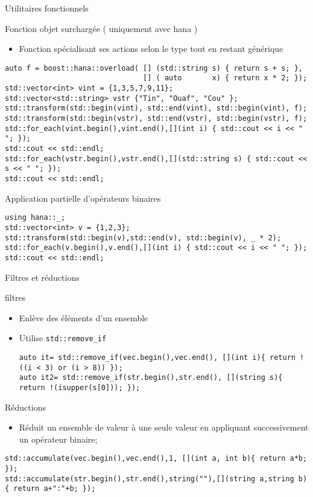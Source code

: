 \documentclass[handout,10pt]{beamer}
\begin{document}
\begin{frame}[fragile]{Utilitaires fonctionnels}
  \tiny
\begin{block}{Fonction objet surchargée ( uniquement avec hana )}
\begin{itemize}
 \item Fonction spécialisant ses actions selon le type tout en restant générique
\end{itemize}
\begin{lstlisting}
auto f = boost::hana::overload( [] (std::string s) { return s + s; },
                                [] ( auto       x) { return x * 2; });
std::vector<int> vint = {1,3,5,7,9,11};
std::vector<std::string> vstr {"Tin", "Ouaf", "Cou" };
std::transform(std::begin(vint), std::end(vint), std::begin(vint), f);
std::transform(std::begin(vstr), std::end(vstr), std::begin(vstr), f);
std::for_each(vint.begin(),vint.end(),[](int i) { std::cout << i << " "; });
std::cout << std::endl;
std::for_each(vstr.begin(),vstr.end(),[](std::string s) { std::cout << s << " "; });
std::cout << std::endl;                         
\end{lstlisting}
\end{block}
\begin{block}{Application partielle d'opérateurs binaires}
\begin{lstlisting}
using hana::_;
std::vector<int> v = {1,2,3};
std::transform(std::begin(v),std::end(v), std::begin(v), _ * 2);
std::for_each(v.begin(),v.end(),[](int i) { std::cout << i << " "; });
std::cout << std::endl;
\end{lstlisting}
\end{block}
\end{frame}

\begin{frame}[fragile]{Filtres et réductions}
\tiny
\begin{block}{filtres}
\begin{itemize}
\item Enlève des éléments d'un ensemble
\item Utilise \lstinline$std::remove_if$
\begin{lstlisting}
auto it= std::remove_if(vec.begin(),vec.end(), [](int i){ return !((i < 3) or (i > 8)) }); 
auto it2= std::remove_if(str.begin(),str.end(), [](string s){ return !(isupper(s[0])); });
\end{lstlisting}
\end{itemize}
\end{block}
\begin{block}{Réductions}
\begin{itemize}
\item Réduit un ensemble de valeur à une seule valeur en appliquant successivement un opérateur binaire;
\end{itemize}
\begin{lstlisting}
std::accumulate(vec.begin(),vec.end(),1, [](int a, int b){ return a*b; }); 
std::accumulate(str.begin(),str.end(),string(""),[](string a,string b){ return a+":"+b; });   
\end{lstlisting}
\end{block}
\end{frame}
\end{document}
